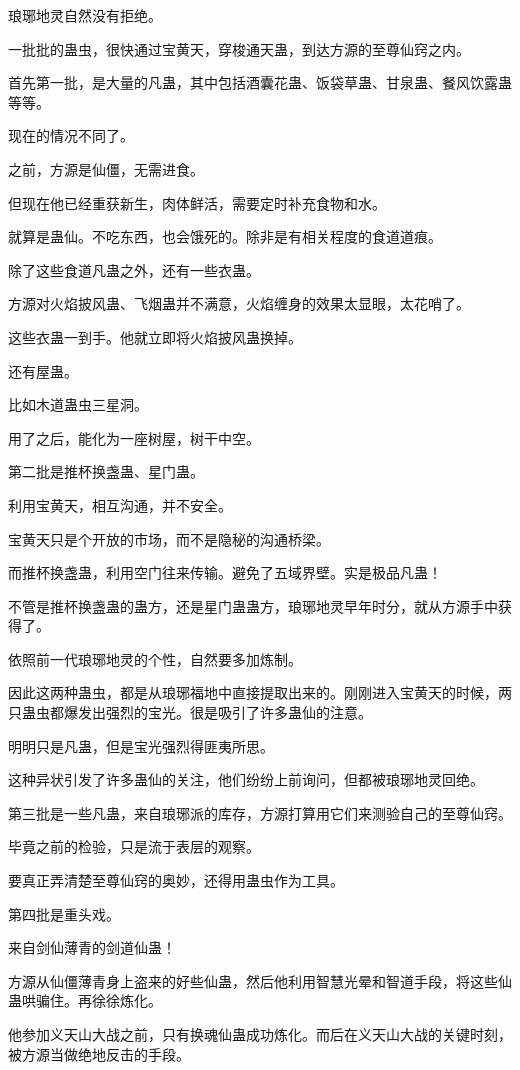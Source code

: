 \begin{this_body}
琅琊地灵自然没有拒绝。

一批批的蛊虫，很快通过宝黄天，穿梭通天蛊，到达方源的至尊仙窍之内。

首先第一批，是大量的凡蛊，其中包括酒囊花蛊、饭袋草蛊、甘泉蛊、餐风饮露蛊等等。

现在的情况不同了。

之前，方源是仙僵，无需进食。

但现在他已经重获新生，肉体鲜活，需要定时补充食物和水。

就算是蛊仙。不吃东西，也会饿死的。除非是有相关程度的食道道痕。

除了这些食道凡蛊之外，还有一些衣蛊。

方源对火焰披风蛊、飞烟蛊并不满意，火焰缠身的效果太显眼，太花哨了。

这些衣蛊一到手。他就立即将火焰披风蛊换掉。

还有屋蛊。

比如木道蛊虫三星洞。

用了之后，能化为一座树屋，树干中空。

第二批是推杯换盏蛊、星门蛊。

利用宝黄天，相互沟通，并不安全。

宝黄天只是个开放的市场，而不是隐秘的沟通桥梁。

而推杯换盏蛊，利用空门往来传输。避免了五域界壁。实是极品凡蛊！

不管是推杯换盏蛊的蛊方，还是星门蛊蛊方，琅琊地灵早年时分，就从方源手中获得了。

依照前一代琅琊地灵的个性，自然要多加炼制。

因此这两种蛊虫，都是从琅琊福地中直接提取出来的。刚刚进入宝黄天的时候，两只蛊虫都爆发出强烈的宝光。很是吸引了许多蛊仙的注意。

明明只是凡蛊，但是宝光强烈得匪夷所思。

这种异状引发了许多蛊仙的关注，他们纷纷上前询问，但都被琅琊地灵回绝。

第三批是一些凡蛊，来自琅琊派的库存，方源打算用它们来测验自己的至尊仙窍。

毕竟之前的检验，只是流于表层的观察。

要真正弄清楚至尊仙窍的奥妙，还得用蛊虫作为工具。

第四批是重头戏。

来自剑仙薄青的剑道仙蛊！

方源从仙僵薄青身上盗来的好些仙蛊，然后他利用智慧光晕和智道手段，将这些仙蛊哄骗住。再徐徐炼化。

他参加义天山大战之前，只有换魂仙蛊成功炼化。而后在义天山大战的关键时刻，被方源当做绝地反击的手段。


\end{this_body}
